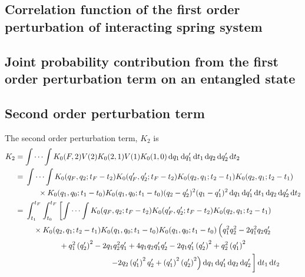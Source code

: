 \subsection{Correlation function of the first order perturbation of interacting spring system}

\subsection{Joint probability contribution from the first order perturbation term on an entangled state}

\subsection{Second order perturbation term}

The second order perturbation term, $K_2$ is
\begin{align}
    K_2 &= \idotsint K_0(F, 2)V(2)K_0(2, 1)V(1)K_0(1, 0)\dd{q_1}\dd{q_1'}\dd{t_1}\dd{q_2}\dd{q_2'}\dd{t_2} \\
    &= \begin{multlined}[t]
        \idotsint K_0(q_F, q_2; t_F - t_2)K_0(q_F', q_2'; t_F - t_2)K_0(q_2, q_1; t_2 - t_1)K_0(q_2, q_1; t_2 - t_1) \\ \times K_0(q_1, q_0; t_1 - t_0)K_0(q_1, q_0; t_1 - t_0)(q_2 - q_2')^2(q_1 - q_1')^2\dd{q_1}\dd{q_1'}\dd{t_1}\dd{q_2}\dd{q_2'}\dd{t_2}
    \end{multlined} \\
    &= \begin{multlined}[t]
        \int_{t_1}^{t_F}\int_{t_0}^{t_F}\left[\idotsint K_0(q_F, q_2; t_F - t_2)K_0(q_F', q_2'; t_F - t_2)K_0(q_2, q_1; t_2 - t_1)\right. \\ \times K_0(q_2, q_1; t_2 - t_1)K_0(q_1, q_0; t_1 - t_0)K_0(q_1, q_0; t_1 - t_0) \left(\vphantom{\left(q_{2}^{\prime}\right)^{2}} q_{1}^{2} q_{2}^{2} - 2 q_{1}^{2} q_{2} q_{2}^{\prime} \right.\\ + q_{1}^{2} \left(q_{2}^{\prime}\right)^{2} - 2 q_{1} q_{2}^{2} q_{1}^{\prime} + 4 q_{1} q_{2} q_{1}^{\prime} q_{2}^{\prime} - 2 q_{1} q_{1}^{\prime} \left(q_{2}^{\prime}\right)^{2} + q_{2}^{2} \left(q_{1}^{\prime}\right)^{2} \\ \left.\left. - 2 q_{2} \left(q_{1}^{\prime}\right)^{2} q_{2}^{\prime} + \left(q_{1}^{\prime}\right)^{2} \left(q_{2}^{\prime}\right)^{2} \right) \dd{q_1}\dd{q_1'}\dd{q_2}\dd{q_2'} \vphantom{\idotsint}\right]\dd{t_1}\dd{t_2}
    \end{multlined}
\end{align}
